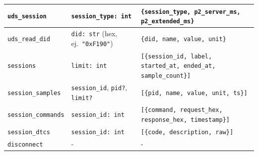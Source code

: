 \begin{table}[H]
\begin{tabular}{|l|p{3.8cm}|p{7cm}|}
\hline
\texttt{uds\_session}    & \texttt{session\_type: int}                                & \texttt{\{session\_type, p2\_server\_ms, p2\_extended\_ms\}} \\
\hline
\texttt{uds\_read\_did}  & \texttt{did: str} (hex, ej.\ \texttt{"0xF190"})           & \texttt{\{did, name, value, unit\}} \\
\hline
\texttt{sessions}        & \texttt{limit: int}                                        & \texttt{[\{session\_id, label, started\_at, ended\_at, sample\_count\}]} \\
\hline
\texttt{session\_samples}& \texttt{session\_id}, \texttt{pid?}, \texttt{limit?}       & \texttt{[\{pid, name, value, unit, ts\}]} \\
\hline
\texttt{session\_commands}& \texttt{session\_id: int}                                 & \texttt{[\{command, request\_hex, response\_hex, timestamp\}]} \\
\hline
\texttt{session\_dtcs}   & \texttt{session\_id: int}                                  & \texttt{[\{code, description, raw\}]} \\
\hline
\texttt{disconnect}      & -                                                          & - \\
\hline
\end{tabular}
\end{table}
